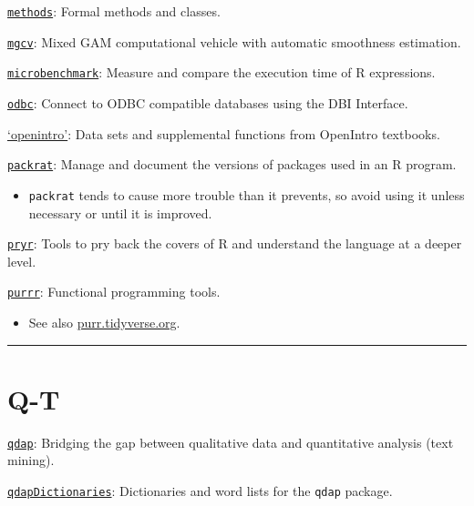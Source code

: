 \documentclass[
]{book}
\providecommand{\tightlist}{%
  \setlength{\itemsep}{0pt}\setlength{\parskip}{0pt}}
\begin{document}
\href{https://www.rdocumentation.org/packages/methods/versions/3.5.1}{\texttt{methods}}: Formal methods and classes.

\href{https://CRAN.R-project.org/package=mgcv}{\texttt{mgcv}}: Mixed GAM computational vehicle with automatic smoothness estimation.

\href{https://CRAN.R-project.org/package=microbenchmark}{\texttt{microbenchmark}}: Measure and compare the execution time of R expressions.

\href{https://CRAN.R-project.org/package=odbc}{\texttt{odbc}}: Connect to ODBC compatible databases using the DBI Interface.

\href{https://CRAN.R-project.org/package=openintro}{`openintro'}: Data sets and supplemental functions from OpenIntro textbooks.

\href{https://CRAN.R-project.org/package=packrat}{\texttt{packrat}}: Manage and document the versions of packages used in an R program.

\begin{itemize}
\tightlist
\item
  \texttt{packrat} tends to cause more trouble than it prevents, so avoid using it unless necessary or until it is improved.
\end{itemize}

\href{https://CRAN.R-project.org/package=pryr}{\texttt{pryr}}: Tools to pry back the covers of R and understand the language at a deeper level.

\href{https://CRAN.R-project.org/package=purrr}{\texttt{purrr}}: Functional programming tools.

\begin{itemize}
\tightlist
\item
  See also \href{https://purrr.tidyverse.org/}{purr.tidyverse.org}.
\end{itemize}

\begin{center}\rule{0.5\linewidth}{0.5pt}\end{center}

\hypertarget{q-t}{%
\section{Q-T}\label{q-t}}

\href{https://CRAN.R-project.org/package=qdap}{\texttt{qdap}}: Bridging the gap between qualitative data and quantitative analysis (text mining).

\href{https://CRAN.R-project.org/package=qdapDictionaries}{\texttt{qdapDictionaries}}: Dictionaries and word lists for the \texttt{qdap} package.
\end{document}
